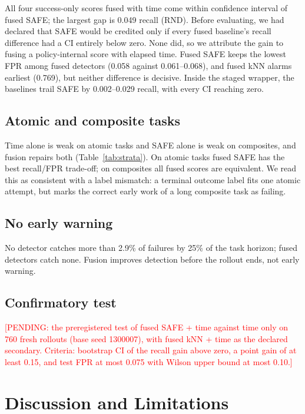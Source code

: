 \documentclass[conference,a4paper]{IEEEtran}
\newcommand{\pending}[1]{\textcolor{red}{[PENDING: #1]}}
\begin{document}
All four success-only scores fused with time come within confidence interval of fused SAFE;
the largest gap is 0.049 recall (RND). Before evaluating, we had declared that SAFE would be
credited only if every fused baseline's recall difference had a CI entirely below zero.
None did, so we attribute the gain to fusing a policy-internal score with elapsed time.
Fused SAFE keeps the lowest FPR among fused detectors (0.058 against 0.061--0.068), and fused
kNN alarms earliest (0.769), but neither difference is decisive. Inside the staged wrapper,
the baselines trail SAFE by 0.002--0.029 recall, with every CI reaching zero.

\subsection{Atomic and composite tasks}



Time alone is weak on atomic tasks and SAFE alone is weak on composites, and fusion repairs
both (Table~\ref{tab:strata}). On atomic tasks fused SAFE has the best recall/FPR trade-off;
on composites all fused scores are equivalent. We read this as consistent with a label
mismatch: a terminal outcome label fits one atomic attempt, but marks the correct early work
of a long composite task as failing.

\subsection{No early warning}

No detector catches more than 2.9\% of failures by 25\% of the task horizon; fused detectors
catch none. Fusion improves detection before the rollout ends, not early warning.

\subsection{Confirmatory test}

\pending{the preregistered test of fused SAFE + time against time only on 760 fresh rollouts
(base seed 1300007), with fused kNN + time as the declared secondary. Criteria: bootstrap CI
of the recall gain above zero, a point gain of at least 0.15, and test FPR at most 0.075
with Wilson upper bound at most 0.10.}

\section{Discussion and Limitations}
\end{document}
